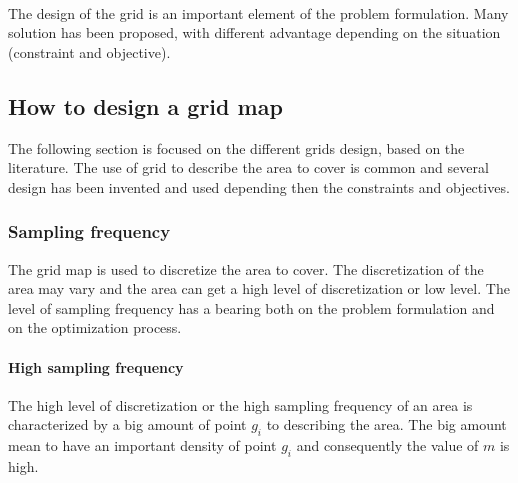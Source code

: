 \\ The design of the grid is an important element of the problem formulation. Many solution has been proposed, with different advantage depending on the situation (constraint and objective).\\

\subsection{How to design a grid map} \label{sec:GridMap}%

The following section is focused on the different grids design, based on the literature. The use of grid to describe the area to cover is common and several design has been invented and used depending then the constraints and objectives.  


\subsubsection{Sampling frequency} %
The grid map is used to discretize the area to cover. The discretization of the area may vary and the area can get a high level of discretization or low level. The level of sampling frequency has a bearing both on the problem formulation and on the optimization process.

\paragraph*{High sampling frequency}
The high level of discretization or the high sampling frequency of an area is characterized by a big amount of point $g_i$ to describing the area. The big amount mean to have an important density of point $g_i$ and consequently the value of $m$ is high. 

